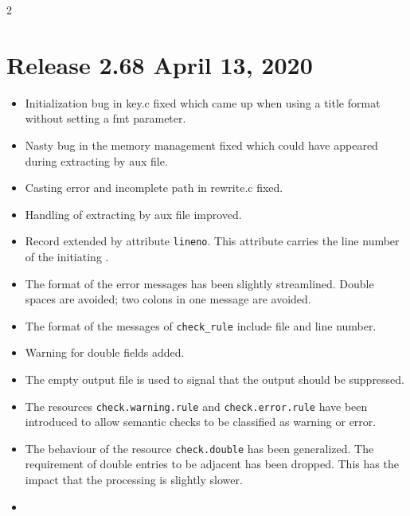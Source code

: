 \documentclass[11pt,a4paper]{scrartcl}
\newcommand\rsc[1]{\texttt{#1}}
\newcommand\File[1]{\textsf{#1}}
\newenvironment{Releases}{\begin{multicols}2\RaggedRight}{\end{multicols}}
\newenvironment{Release}[2]{%
  \def\tmp{#2}%
  \section*{Release #1 \ifx\tmp\empty\else{\normalsize[#2]}\fi}
  \begin{itemize}
}{\end{itemize}}
\newenvironment{Fix}[1]{\item }{}
\newenvironment{New}[1]{\item }{}
\newenvironment{Update}[1]{\item }{}
\begin{document}
\begin{Releases}
 \begin{Release}{2.68}{April 13, 2020}
  \begin{Fix}{gene}
    Initialization bug in \File{key.c} fixed which came up when using a title
    format without setting a fmt parameter.
  \end{Fix}
  \begin{Fix}{gene}
    Nasty bug in the memory management fixed which could have appeared
    during extracting by aux file.
  \end{Fix}
  \begin{Fix}{gene}
    Casting error and incomplete path in \File{rewrite.c} fixed.
  \end{Fix}
  \begin{Update}{gene}
    Handling of extracting by aux file improved.
  \end{Update}
  \begin{New}{gene}
    Record extended by attribute \texttt{lineno}.
    This attribute carries the line number of the initiating \@.
  \end{New}
  \begin{Update}{gene}
    The format of the error messages has been slightly streamlined.
    Double spaces are avoided; two colons in one message are avoided.
  \end{Update}
  \begin{Update}{gene}
    The format of the messages of \verb|check_rule| include file and line
    number.
  \end{Update}
  \begin{New}{gene}
    Warning for double fields added.
  \end{New}
  \begin{New}{gene}
    The empty output file is used to signal that the output should be
    suppressed.
  \end{New}
  \begin{New}{gene}
    The resources \rsc{check.warning.rule} and \rsc{check.error.rule}
    have been introduced to allow semantic checks to be classified as
    warning or error.
  \end{New}
  \begin{New}{gene}
    The behaviour of the resource \rsc{check.double} has been
    generalized. The requirement of double entries to be adjacent has
    been dropped. This has the impact that the processing is slightly
    slower.
  \end{New}
  \begin{New}{gene}

\end{New}
\end{Release}
\end{Releases}
\end{document}
